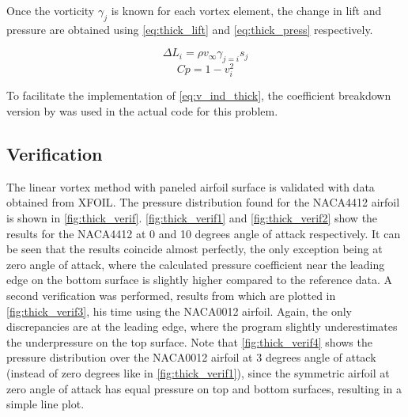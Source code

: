 Once the vorticity $\gamma_j$ is known for each vortex element, the change in
lift and pressure are obtained using \autoref{eq:thick_lift} and
\autoref{eq:thick_press} respectively.

\begin{equation}
\label{eq:thick_lift}
\Delta L_i = \rho v_\infty \gamma_{j=i} s_j
\end{equation}
\medskip
\begin{equation}
\label{eq:thick_press}
Cp = 1 - v_i^2
\end{equation}
\medskip

To facilitate the implementation of \autoref{eq:v_ind_thick}, the coefficient
breakdown version by \citeauthor{kuethe_chow_1998} was used in the actual code
for this problem.

\subsection{Verification}
The linear vortex method with paneled airfoil surface is validated with data
obtained from XFOIL\cite{xfoil}. The pressure distribution found for the
NACA4412 airfoil is shown in \autoref{fig:thick_verif}.
\autoref{fig:thick_verif1} and \autoref{fig:thick_verif2} show the results for
the NACA4412 at 0 and 10 degrees angle of attack respectively. It can be seen
that the results coincide almost perfectly, the only exception being at zero
angle of attack, where the calculated pressure coefficient near the leading edge
on the bottom surface is slightly higher compared to the reference data. A
second verification was performed, results from which are plotted in
\autoref{fig:thick_verif3}, his time using the NACA0012 airfoil. Again, the
only discrepancies are at the leading edge, where the program slightly
underestimates the underpressure on the top surface. Note that
\autoref{fig:thick_verif4} shows the pressure distribution over the NACA0012
airfoil at 3 degrees angle of attack (instead of zero degrees like in
\autoref{fig:thick_verif1}), since the symmetric airfoil at zero angle of attack
has equal pressure on top and bottom surfaces, resulting in a simple line plot.

